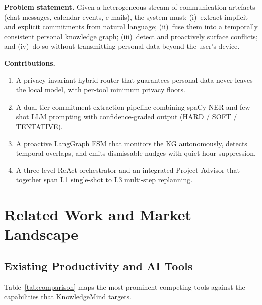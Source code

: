 \documentclass[10pt,twocolumn]{article}
\begin{document}
\medskip\noindent\textbf{Problem statement.}
Given a heterogeneous stream of communication artefacts (chat messages,
calendar events, e-mails), the system must: (i)~extract implicit and explicit
commitments from natural language; (ii)~fuse them into a temporally consistent
personal knowledge graph; (iii)~detect and proactively surface conflicts;
and (iv)~do so without transmitting personal data beyond the user's device.

\medskip\noindent\textbf{Contributions.}
\begin{enumerate}
  \item A privacy-invariant hybrid router that guarantees personal data never
        leaves the local model, with per-tool minimum privacy floors.
  \item A dual-tier commitment extraction pipeline combining spaCy NER and
        few-shot LLM prompting with confidence-graded output
        (HARD / SOFT / TENTATIVE).
  \item A proactive LangGraph FSM that monitors the KG autonomously, detects
        temporal overlaps, and emits dismissable nudges with quiet-hour
        suppression.
  \item A three-level ReAct orchestrator and an integrated Project Advisor that
        together span L1 single-shot to L3 multi-step replanning.
\end{enumerate}

\section{Related Work and Market Landscape}

\subsection{Existing Productivity and AI Tools}

Table~\ref{tab:comparison} maps the most prominent competing tools against the
capabilities that KnowledgeMind targets.
\end{document}
